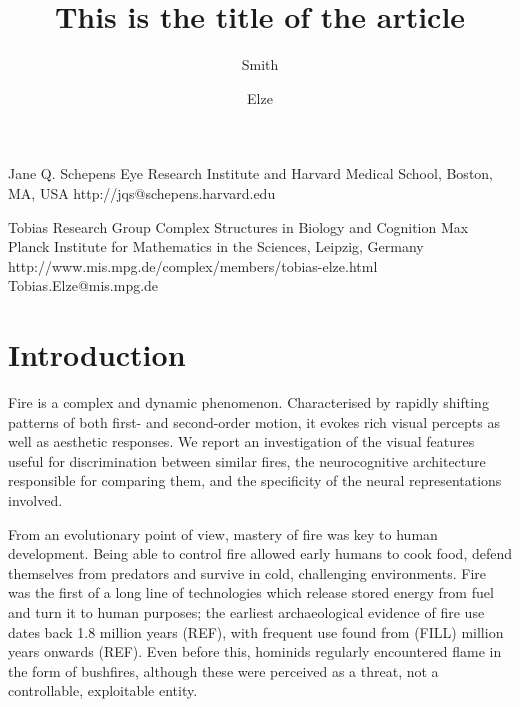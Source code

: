 \documentclass{jov}
\begin{document}
\title{This is the title of the article}

\author{Smith}{Jane Q.}
 {Schepens Eye Research Institute}
 {and Harvard Medical School, Boston, MA, USA}
 {http://}{jqs@schepens.harvard.edu}
\author{Elze}{Tobias}
 {Research Group Complex Structures in Biology and Cognition}
 {Max Planck Institute for Mathematics in the Sciences, Leipzig, Germany}
 {http://www.mis.mpg.de/complex/members/tobias-elze.html}
 {Tobias.Elze@mis.mpg.de}


\maketitle

\section{Introduction}


Fire is a complex and dynamic phenomenon. Characterised by rapidly shifting patterns of both first- and second-order motion, it evokes rich visual percepts as well as aesthetic responses. We report an investigation of the visual features useful for discrimination between similar fires, the neurocognitive architecture responsible for comparing them, and the specificity of the neural representations involved.


From an evolutionary point of view, mastery of fire was key to human development. Being able to control fire allowed early humans to cook food, defend themselves from predators and survive in cold, challenging environments. Fire was the first of a long line of technologies which release stored energy from fuel and turn it to human purposes; the earliest archaeological evidence of fire use dates back 1.8 million years (REF), with frequent use found from (FILL) million years onwards (REF). Even before this, hominids regularly encountered flame in the form of bushfires, although these were perceived as a threat, not a controllable, exploitable entity.
\end{document}
